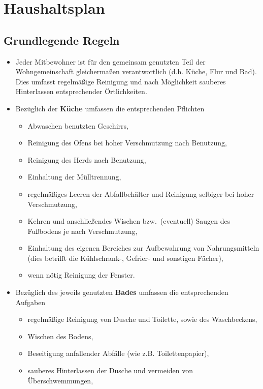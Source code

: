 \documentclass{article}
\begin{document}
\pagestyle{empty}
\section*{Haushaltsplan}

\subsection*{Grundlegende Regeln}

\begin{itemize}
        \item Jeder Mitbewohner ist für den gemeinsam genutzten Teil der Wohngemeinschaft gleichermaßen verantwortlich (d.h. Küche, Flur und Bad).
    Dies umfasst regelmäßige Reinigung und nach Möglichkeit sauberes Hinterlassen entsprechender Örtlichkeiten.
    \item Bezüglich der \textbf{Küche} umfassen die entsprechenden Pflichten
    \begin{itemize}
            \item Abwaschen benutzten Geschirrs,
            \item Reinigung des Ofens bei hoher Verschmutzung nach Benutzung,
            \item Reinigung des Herds nach Benutzung,
            \item Einhaltung der Mülltrennung,
            \item regelmäßiges Leeren der Abfallbehälter und Reinigung selbiger bei hoher Verschmutzung,
            \item Kehren und anschließendes Wischen bzw.\ (eventuell) Saugen des Fußbodens je nach Verschmutzung,
            \item Einhaltung des eigenen Bereiches zur Aufbewahrung von Nahrungsmitteln (dies betrifft die Kühlschrank-, Gefrier- und sonstigen Fächer),
            \item wenn nötig Reinigung der Fenster.
    \end{itemize}
        \item Bezüglich des jeweils genutzten \textbf{Bades} umfassen die entsprechenden Aufgaben
    \begin{itemize}
            \item regelmäßige Reinigung von Dusche und Toilette, sowie des Waschbeckens,
            \item Wischen des Bodens,
            \item Beseitigung anfallender Abfälle (wie z.B. Toilettenpapier),
            \item sauberes Hinterlassen der Dusche und vermeiden von Überschwemmungen,

\end{itemize}
\end{itemize}
\end{document}
